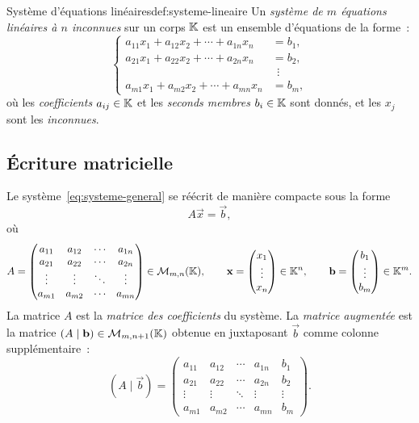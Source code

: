 \begin{definition}{Système d'équations linéaires}{def:systeme-lineaire}
  Un \emph{système de $m$ équations linéaires à $n$ inconnues}
  sur un corps ${\mathbb{K}}$ est un ensemble d'équations de la forme~:
  \begin{equation}\label{eq:systeme-general}
    \left\{
    \begin{aligned}
      a_{11}x_1 + a_{12}x_2 + \cdots + a_{1n}x_n &= b_1,\\
      a_{21}x_1 + a_{22}x_2 + \cdots + a_{2n}x_n &= b_2,\\
      &\;\,\vdots\\
      a_{m1}x_1 + a_{m2}x_2 + \cdots + a_{mn}x_n &= b_m,
    \end{aligned}
    \right.
  \end{equation}
  où les \emph{coefficients} $a_{ij}\in{\mathbb{K}}$ et les \emph{seconds membres}
  $b_i\in{\mathbb{K}}$ sont donnés, et les $x_j$ sont les \emph{inconnues}.
\end{definition}

\subsection{Écriture matricielle}\label{subsec:ecriture-matricielle}

Le système~\eqref{eq:systeme-general} se réécrit de manière compacte
sous la forme
\begin{equation}\label{eq:Axb}
  A\vec{x}=\vec{b},
\end{equation}
où
\[
  A = \begin{pmatrix}
    a_{11} & a_{12} & \cdots & a_{1n}\\
    a_{21} & a_{22} & \cdots & a_{2n}\\
    \vdots & \vdots & \ddots & \vdots\\
    a_{m1} & a_{m2} & \cdots & a_{mn}
  \end{pmatrix}\in\mathcal{M}_{m,n}({\mathbb{K}}),\qquad
  \mathbf{x} = \begin{pmatrix}x_1\\\vdots\\x_n\end{pmatrix}\in{\mathbb{K}}^n,\qquad
  \mathbf{b} = \begin{pmatrix}b_1\\\vdots\\b_m\end{pmatrix}\in{\mathbb{K}}^m.
\]
La matrice $A$ est la \emph{matrice des coefficients}
du système. La \emph{matrice augmentée} est la
matrice $(A\mid\mathbf{b})\in\mathcal{M}_{m,n+1}({\mathbb{K}})$ obtenue en juxtaposant $\vec{b}$
comme colonne supplémentaire~:
\begin{equation}\label{eq:matrice-augmentee}
  (A\mid\vec{b}) = \left(\begin{array}{cccc|c}
    a_{11} & a_{12} & \cdots & a_{1n} & b_1\\
    a_{21} & a_{22} & \cdots & a_{2n} & b_2\\
    \vdots & \vdots & \ddots & \vdots & \vdots\\
    a_{m1} & a_{m2} & \cdots & a_{mn} & b_m
  \end{array}\right).
\end{equation}

